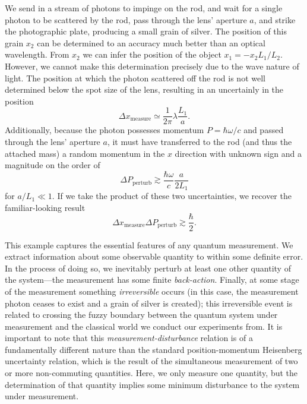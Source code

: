 We send in a stream of photons to impinge on the rod, and wait for a single photon to be scattered by the rod, pass through the lens' aperture $a$, and strike the photographic plate, producing a small grain of silver.  The position of this grain $x_2$ can be determined to an accuracy much better than an optical wavelength.  From $x_2$ we can infer the position of the object $x_1 = -x_2 L_1 / L_2$.  However, we cannot make this determination precisely due to the wave nature of light.  The position at which the photon scattered off the rod is not well determined below the spot size of the lens, resulting in an uncertainly in the position
\begin{equation}
\Delta x_{\textrm{measure}} \simeq \frac{1}{2 \pi}\lambda \frac{L_1}{a}.
\label{eq:dxmeas}
\end{equation}
Additionally, because the photon possesses momentum $P = \hbar \omega / c$ and passed through the lens' aperture $a$, it must have transferred to the rod (and thus the attached mass) a random momentum in the $x$ direction with unknown sign and a magnitude on the order of
\begin{equation}
\Delta P_{\textrm{perturb}} \gtrsim \frac{\hbar \omega}{c} \frac{a}{2 L_1} 
\label{eq:dPpert}
\end{equation}
for $a/L_1 \ll 1$.  If we take the product of these two uncertainties, we recover the familiar-looking result
\begin{equation}
\Delta x_{\textrm{measure}} \Delta P_{\textrm{perturb}} \gtrsim \frac{\hbar}{2}.
\label{eq:dxdP}
\end{equation}

This example captures the essential features of any quantum measurement.  We extract information about some observable quantity to within some definite error.  In the process of doing so, we inevitably perturb at least one other quantity of the system---the measurement has some finite \textit{back-action}.  Finally, at some stage of the measurement something \textit{irreversible} occurs (in this case, the measurement photon ceases to exist and a grain of silver is created); this irreversible event is related to crossing the fuzzy boundary between the quantum system under measurement and the classical world we conduct our experiments from.  It is important to note that this \textit{measurement-disturbance} relation is of a fundamentally different nature than the standard position-momentum Heisenberg uncertainty relation, which is the result of the simultaneous measurement of two or more non-commuting quantities.  Here, we only measure one quantity, but the determination of that quantity implies some minimum disturbance to the system under measurement.

